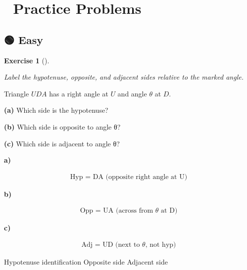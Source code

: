 \documentclass[
  letterpaper,
  DIV=11,
  numbers=noendperiod]{scrreprt}
\theoremstyle{definition}
\newtheorem{exercise}{Exercise}[chapter]
\theoremstyle{remark}
\begin{document}
\section{📝 Practice Problems}\label{practice-problems-5}

\subsection{🟢 Easy}

\begin{exercise}[]\protect\hypertarget{exr-trig-1}{}\label{exr-trig-1}

\emph{Label the hypotenuse, opposite, and adjacent sides relative to the
marked angle.}

Triangle \(UDA\) has a right angle at \(U\) and angle \(\theta\) at
\(D\).

\textbf{(a)} Which side is the hypotenuse?

\textbf{(b)} Which side is opposite to angle θ?

\textbf{(c)} Which side is adjacent to angle θ?

\begin{tcolorbox}[enhanced jigsaw, opacitybacktitle=0.6, coltitle=black, arc=.35mm, colframe=quarto-callout-tip-color-frame, colback=white, bottomrule=.15mm, left=2mm, colbacktitle=quarto-callout-tip-color!10!white, titlerule=0mm, opacityback=0, title=\textcolor{quarto-callout-tip-color}{\faLightbulb}\hspace{0.5em}{🔍 View Solution}, leftrule=.75mm, breakable, rightrule=.15mm, bottomtitle=1mm, toptitle=1mm, toprule=.15mm]

\textbf{a)}

\[
\begin{aligned}
\text{Hyp = DA (opposite right angle at U)}
\end{aligned}
\]

\textbf{b)}

\[
\begin{aligned}
\text{Opp = UA (across from } \theta \text{ at D)}
\end{aligned}
\]

\textbf{c)}

\[
\begin{aligned}
\text{Adj = UD (next to } \theta \text{, not hyp)}
\end{aligned}
\]

\end{tcolorbox}

{Hypotenuse identification} {Opposite side} {Adjacent side}

\end{exercise}
\end{document}
